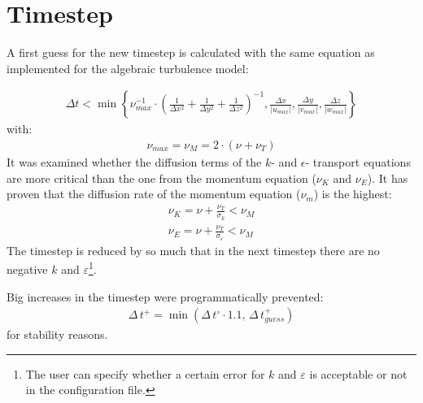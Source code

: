 \newpage
\section*{Timestep}
A first guess for the new timestep is calculated with the same equation as implemented for the algebraic turbulence model:

\begin{align}
\Delta t < \min\left\lbrace
\nu_{max}^{-1}\cdot
\left( 
\frac{1}{\Delta x^2}+
\frac{1}{\Delta y^2}+
\frac{1}{\Delta z^2}
\right)^{-1}
,
\frac{\Delta x}{|u_{max}|},
\frac{\Delta y}{|v_{max}|},
\frac{\Delta z}{|w_{max}|}
\right\rbrace
\end{align}
with:
\begin{align}
\nu_{max}=\nu_M = 2\cdot\left( \nu+\nu_T \right)
\end{align}
It was examined whether the diffusion terms of the $k$- and $\epsilon$- transport equations are more critical than the one from the momentum equation ($\nu_K$ and $\nu_E$). It has proven that the diffusion rate of the momentum equation ($\nu_m$) is the highest:
\begin{align}
\nu_K = \nu+\frac{\nu_T}{\sigma_k}<\nu_M\\
\nu_E = \nu+\frac{\nu_T}{\sigma_\varepsilon}<\nu_M
\end{align}
The timestep is reduced by so much that in the next timestep there are no negative $k$ and $\varepsilon$\footnote{The user can specify whether a certain error for $k$ and $\varepsilon$ is acceptable or not in the configuration file.}.

\noii Big increases in the timestep were programmatically prevented:
\begin{align*}
\Delta\,t^+=\min{(\Delta\,t^\circ\cdot 1.1,\,\Delta\,t^+_{guess})}
\end{align*} 
for stability reasons.

\newpage
